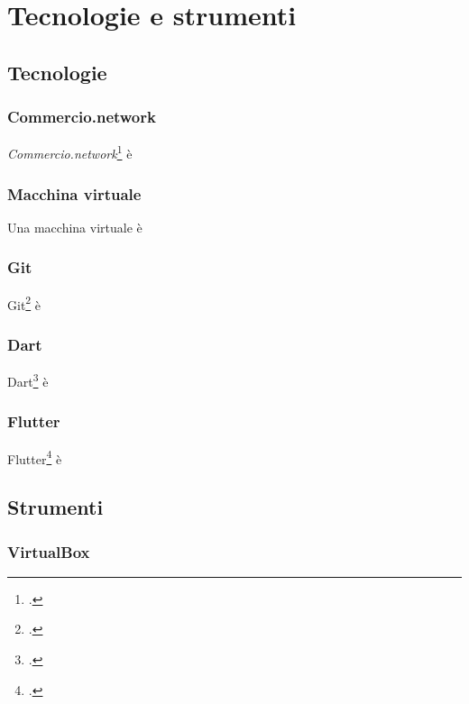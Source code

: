 
\chapter{Tecnologie e strumenti}
\label{cap:tecnologie-strumenti}

\section{Tecnologie}
\subsection*{Commercio.network}

\textit{Commercio.network}\footcite{site:commercio-network} è

\subsection*{Macchina virtuale}

Una macchina virtuale è

\subsection*{Git}

Git\footcite{site:git} è

\subsection*{Dart}

Dart\footcite{site:dart} è 

\subsection*{Flutter}

Flutter\footcite{site:flutter} è

\section{Strumenti}
\subsection*{VirtualBox}

